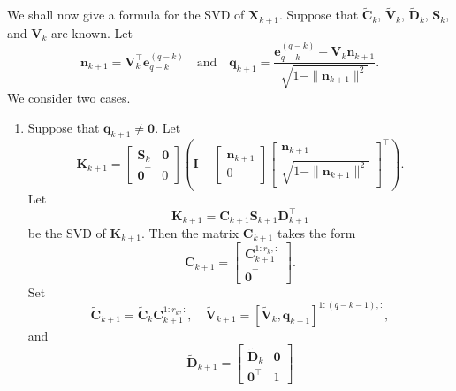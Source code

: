 \documentclass[11pt,a4paper]{article}
\theoremstyle{mybreak}
\numberwithin{dummy}{section}
\theoremstyle{plain}
\theoremstyle{plain}
\theoremstyle{plain}
\theoremstyle{plain}
\theoremstyle{MyNonumberplain}
\newcommand{\0}{\M{0}}
\newcommand{\M}[1]{\mathbf{#1}}
\newcommand{\Mt}[1]{\tilde{\M{#1}}}
\newcommand{\T}{\top}
\newcommand{\ve}[1]{\mathbf{#1}}
\newcommand{\eve}[2]{\mathbf{e}^{(#1)}_{#2}}
\begin{document}
We shall now give a formula for the SVD of $\M{X}_{k+1}$. Suppose that $\Mt{C}_k$, $\Mt{V}_k$, $\Mt{D}_k$, $\M{S}_k$, and $\M{V}_k$ are known. Let
\begin{displaymath}
  \ve{n}_{k+1} = \M{V}_k^\T \eve{q-k}{q-k}
  \quad
  \text{and}
  \quad
  \ve{q}_{k+1} =  \frac{\eve{q-k}{q-k} - \M{V}_k \ve{n}_{k+1}}{\sqrt{1 - \| \ve{n}_{k+1}\|^2}}.
\end{displaymath}
We consider two cases.
\begin{enumerate}[font=\upshape,label=(\roman*),wide,align=right]
\item Suppose that $\ve{q}_{k+1} \neq \0$. Let
  \begin{displaymath}
    \M{K}_{k+1}
    =
    \begin{bmatrix}
      \M{S}_k & \0
      \\
      \0^\T & 0
    \end{bmatrix}
    \left(
      \M{I}
      -
      \begin{bmatrix}
        \ve{n}_{k+1}
        \\
        0
      \end{bmatrix}
      \begin{bmatrix}
        \ve{n}_{k+1}
        \\
        \sqrt{1 - \| \ve{n}_{k+1} \|^2}
      \end{bmatrix}^\T \right).
  \end{displaymath}
  Let
  \begin{displaymath}
    \M{K}_{k+1} = \M{C}_{k+1} \M{S}_{k+1}  \M{D}_{k+1}^\T
  \end{displaymath}
  be the SVD of $\M{K}_{k+1}$.  Then the matrix $\M{C}_{k+1}$ takes the form
  \begin{displaymath}
    \M{C}_{k+1}
    =
    \begin{bmatrix}
      \M{C}_{k+1}^{1:r_k, :}
      \\
      \0^\T
    \end{bmatrix}.
  \end{displaymath}
  Set
  \begin{displaymath}
    \Mt{C}_{k+1} = \Mt{C}_k \M{C}^{1:r_k, :}_{k+1},
    \quad
    \Mt{V}_{k+1}
    =
    [\Mt{V}_k,  \ve{q}_{k+1}]^{1:(q-k-1),:},
  \end{displaymath}
  and
  \begin{displaymath}
    \Mt{D}_{k+1}
    =
    \begin{bmatrix}
      \Mt{D}_k & \0
      \\
      \0^\T & 1
    \end{bmatrix}

\end{displaymath}
\end{enumerate}
\end{document}
